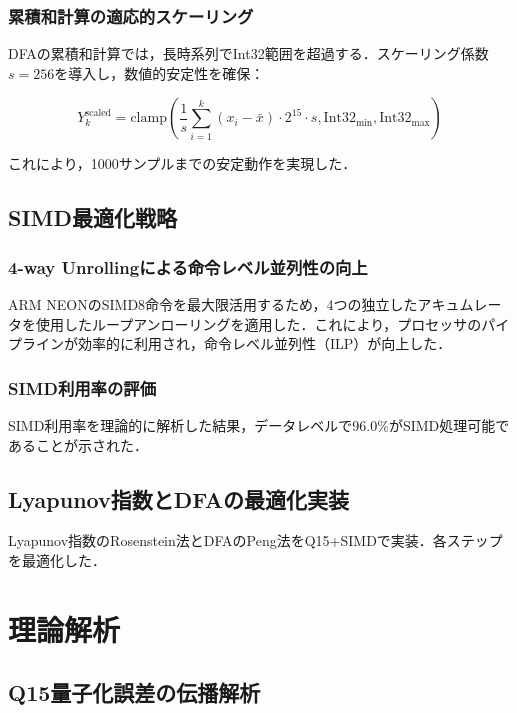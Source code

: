 \documentclass[paper]{ieice}
\begin{document}
\subsubsection{累積和計算の適応的スケーリング}
DFAの累積和計算では，長時系列でInt32範囲を超過する．スケーリング係数$s=256$を導入し，数値的安定性を確保：

\begin{equation}
Y_k^{\text{scaled}} = \text{clamp}\left(\frac{1}{s} \sum_{i=1}^{k} (x_i - \bar{x}) \cdot 2^{15} \cdot s, \text{Int32}_{\min}, \text{Int32}_{\max}\right)
\end{equation}

これにより，1000サンプルまでの安定動作を実現した．

\subsection{SIMD最適化戦略}

\subsubsection{4-way Unrollingによる命令レベル並列性の向上}
ARM NEONのSIMD8命令を最大限活用するため，4つの独立したアキュムレータを使用したループアンローリングを適用した．これにより，プロセッサのパイプラインが効率的に利用され，命令レベル並列性（ILP）が向上した．

\subsubsection{SIMD利用率の評価}
SIMD利用率を理論的に解析した結果，データレベルで96.0\%がSIMD処理可能であることが示された．

\subsection{Lyapunov指数とDFAの最適化実装}

Lyapunov指数のRosenstein法\cite{rosenstein1993}とDFAのPeng法\cite{peng1994}をQ15+SIMDで実装．各ステップを最適化した．

\section{理論解析}

\subsection{Q15量子化誤差の伝播解析}
\end{document}
